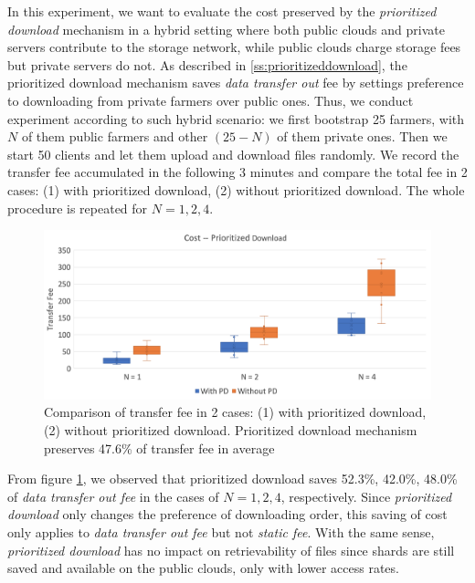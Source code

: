 In this experiment, we want to evaluate the cost preserved by the \textit{prioritized download} mechanism in a hybrid setting where both public clouds and private servers contribute to the storage network, while public clouds charge storage fees but private servers do not. As described in \ref{ss:prioritizeddownload}, the prioritized download mechanism saves \textit{data transfer out} fee by settings preference to downloading from private farmers over public ones. Thus, we conduct experiment according to such hybrid scenario: we first bootstrap 25 farmers, with $N$ of them public farmers and other $(25-N)$ of them private ones.  Then we start 50 clients and let them upload and download files randomly. We record the transfer fee accumulated in the following 3 minutes and compare the total fee in 2 cases: (1) with prioritized download, (2) without prioritized download. The whole procedure is repeated for $N = 1, 2, 4$.

\begin{figure}[hbt]
  \centering
    \includegraphics[width=14cm]{charts/chart_cost_prioritized_download.png}
    \caption[Comparison of transfer fee in 2 cases: (1) with prioritized download, (2) without prioritized download]{Comparison of transfer fee in 2 cases: (1) with prioritized download, (2) without prioritized download. Prioritized download mechanism preserves 47.6\% of transfer fee in average}
    \label{fig:costprioritizeddownload}
\end{figure}

From figure \ref{fig:costprioritizeddownload}, we observed that prioritized download saves 52.3\%, 42.0\%, 48.0\% of \textit{data transfer out fee} in the cases of $N = 1, 2, 4$, respectively. Since \textit{prioritized download} only changes the preference of downloading order, this saving of cost only applies to \textit{data transfer out fee} but not \textit{static fee}. With the same sense, \textit{prioritized download} has no impact on retrievability of files since shards are still saved and available on the public clouds, only with lower access rates.



  